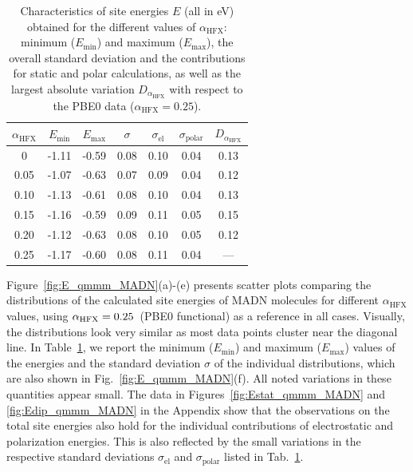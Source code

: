 \documentclass[%
 reprint,
superscriptaddress,
 amsmath,amssymb,
 aps,
prb,
floatfix
]{revtex4-2}
\newcommand{\ahfx}{\ensuremath{\alpha_\text{HFX}}\xspace}
\begin{document}
\begin{table}[tbp]
  \caption{Characteristics of site energies $E$ (all in \unit[]{eV}) obtained for the different values of \ahfx : minimum ($E_\text{min}$) and maximum ($E_\text{max}$), the overall standard deviation and the contributions for static and polar calculations, as well as the largest absolute variation $D_{\ahfx}$ with respect to the PBE0 data ($\ahfx=0.25$).}
  \begin{ruledtabular}
    \begin{tabular}{c c c c c c c}
    $\ahfx$ & $E_\text{min}$ & $E_\text{max}$ & $\sigma$ & $\sigma_\text{el}$ & $\sigma_\text{polar}$ &  $D_{\ahfx}$ \\%
    \hline
    0    & -1.11 & -0.59 & 0.08 & 0.10 & 0.04 & 0.13 \\ %
    0.05 & -1.07 & -0.63 & 0.07 & 0.09 & 0.04 & 0.12 \\ %
    0.10 & -1.13 & -0.61 & 0.08 & 0.10 & 0.04 & 0.13 \\ %
    0.15 & -1.16 & -0.59 & 0.09 & 0.11 & 0.05 & 0.15 \\ %
    0.20 & -1.12 & -0.63 & 0.08 & 0.10 & 0.05 & 0.12 \\ %
    0.25 & -1.17 & -0.60 & 0.08 & 0.11 & 0.04 & ---  \\ %
    \end{tabular}
  \end{ruledtabular}
  \label{tab:maxEi}
\end{table}

Figure~\ref{fig:E_qmmm_MADN}(a)-(e) presents scatter plots comparing the distributions of the calculated site energies of MADN molecules for different \ahfx values, using $\ahfx = \unit[0.25]{}$ (PBE0 functional) as a reference in all cases. Visually, the distributions look very similar as most data points cluster near the diagonal line. In Table~\ref{tab:maxEi}, we report the minimum ($E_\text{min}$) and maximum ($E_\text{max}$) values of the energies and the standard deviation $\sigma$ of the individual distributions, which are also shown in Fig.~\ref{fig:E_qmmm_MADN}(f). All noted variations in these quantities appear small. The data in Figures~\ref{fig:Estat_qmmm_MADN} and \ref{fig:Edip_qmmm_MADN} in the Appendix show that the observations on the total site energies also hold for the individual contributions of electrostatic and polarization energies. This is also reflected by the small variations in the respective standard deviations $\sigma_\text{el}$ and $\sigma_\text{polar}$ listed in Tab.~\ref{tab:maxEi}.
\end{document}
